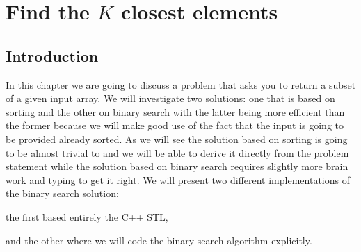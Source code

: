 %

\chapter{Find the $K$ closest elements}
\label{ch:find_k_closest_in_array}
\section*{Introduction}
In this chapter we are going to discuss a problem that asks you to return a subset of a given input
array. We will investigate two solutions: one that is based on sorting and the other on binary
search with the latter being more efficient than the former because we will make good use of the
fact that the input is going to be provided already sorted. As we will see the solution based on
sorting is going to be almost trivial to and we will be able to derive it directly from the problem
statement while the solution based on binary search requires slightly more brain work and typing to
get it right. We will present two different implementations of the binary search solution: 
\begin{enumerate*}
	\item the first based entirely the C++ STL,
	\item and the other where we will code the binary search algorithm explicitly. 
\end{enumerate*}

